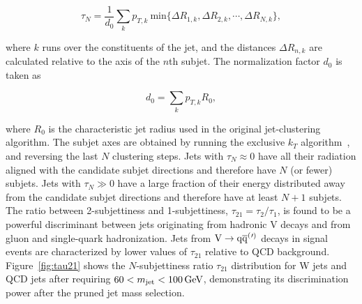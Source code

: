 \begin{equation}
\tau_N = \frac{1}{d_0} \sum_{k} p_{T,k}~\mathrm{min} \{\Delta R_{1,k},\Delta R_{2,k},\cdots,\Delta R_{N,k}\},
\end{equation}

where $k$ runs over the constituents of the jet, and the distances $\Delta R_{n,k}$ are calculated relative to the axis of the $n$th subjet. %
The normalization factor $d_0$ is taken as

\begin{equation}
d_0 = \sum_{k} p_{T,k} R_{0},
\end{equation}

where $R_0$ is the characteristic jet radius used in the original jet-clustering algorithm. The subjet axes are obtained by running the exclusive $k_T$ algorithm~\cite{Ellis:1993tq}, and reversing the last $N$ clustering steps.
Jets with $\tau_N \approx 0$ have all their radiation aligned with the candidate subjet directions and therefore have $N$ (or fewer) subjets. Jets with $\tau_N \gg 0$ have a large fraction of their energy distributed away from the candidate subjet directions and therefore have at least $N+1$ subjets.
The ratio between 2-subjettiness and 1-subjettiness, $\tau_{21} = \tau_{2}/\tau_{1}$, is found to be a powerful discriminant between jets originating from hadronic V decays and from gluon and single-quark hadronization. Jets from $\mathrm{V}\to\mathrm{q}\overline{\mathrm{q}}^({}'^){}$ decays in signal events are characterized by lower values of $\tau_{21}$ relative to QCD background.
Figure~\ref{fig:tau21} shows the $N$-subjettiness ratio $\tau_{21}$ distribution for W jets and QCD jets after requiring $60 < m_{\text{jet}} < 100\,\text{Ge\hspace{-.08em}V}$, demonstrating its discrimination power after the pruned jet mass selection. %


